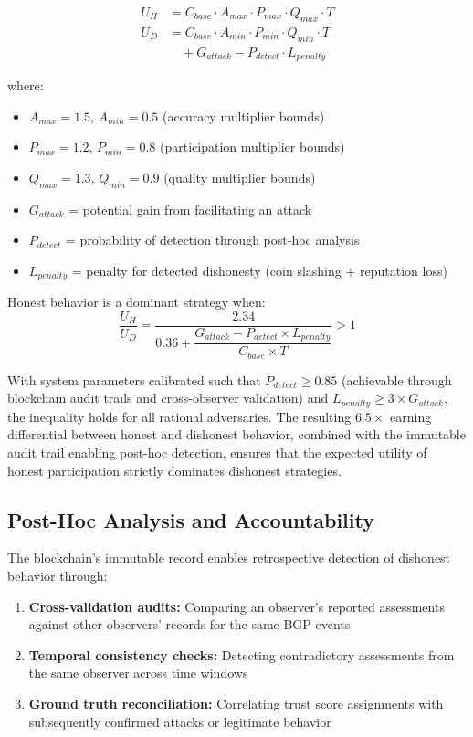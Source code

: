 \begin{align}
U_H &= C_{base} \cdot A_{max} \cdot P_{max} \cdot Q_{max} \cdot T \\
U_D &= C_{base} \cdot A_{min} \cdot P_{min} \cdot Q_{min} \cdot T \nonumber\\
    &\quad + G_{attack} - P_{detect} \cdot L_{penalty}
\end{align}

where:
\begin{itemize}
    \item $A_{max} = 1.5$, $A_{min} = 0.5$ (accuracy multiplier bounds)
    \item $P_{max} = 1.2$, $P_{min} = 0.8$ (participation multiplier bounds)
    \item $Q_{max} = 1.3$, $Q_{min} = 0.9$ (quality multiplier bounds)
    \item $G_{attack}$ = potential gain from facilitating an attack
    \item $P_{detect}$ = probability of detection through post-hoc analysis
    \item $L_{penalty}$ = penalty for detected dishonesty (coin slashing + reputation loss)
\end{itemize}

\begin{theorem}
Honest behavior is a dominant strategy when:
\begin{equation}
\frac{U_H}{U_D} = \frac{2.34}{0.36 + \dfrac{G_{attack} - P_{detect} \!\times\! L_{penalty}}{C_{base} \times T}} > 1
\end{equation}
\end{theorem}

With system parameters calibrated such that $P_{detect} \geq 0.85$ (achievable through blockchain audit trails and cross-observer validation) and $L_{penalty} \geq 3 \times G_{attack}$, the inequality holds for all rational adversaries. The resulting $6.5\times$ earning differential between honest and dishonest behavior, combined with the immutable audit trail enabling post-hoc detection, ensures that the expected utility of honest participation strictly dominates dishonest strategies.

\subsection{Post-Hoc Analysis and Accountability}

The blockchain's immutable record enables retrospective detection of dishonest behavior through:
\begin{enumerate}
    \item \textbf{Cross-validation audits:} Comparing an observer's reported assessments against other observers' records for the same BGP events
    \item \textbf{Temporal consistency checks:} Detecting contradictory assessments from the same observer across time windows
    \item \textbf{Ground truth reconciliation:} Correlating trust score assignments with subsequently confirmed attacks or legitimate behavior
\end{enumerate}

